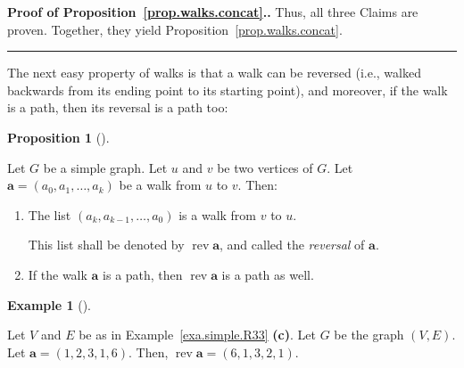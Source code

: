\documentclass[numbers=enddot,12pt,final,onecolumn,notitlepage]{scrartcl}%
\theoremstyle{definition}
\newtheorem{prop}[theo]{Proposition}
\newenvironment{proposition}[1][]
{\begin{prop}[#1]\begin{leftbar}}
{\end{leftbar}\end{prop}}
\newtheorem{exam}[theo]{Example}
\newenvironment{example}[1][]
{\begin{exam}[#1]\begin{leftbar}}
{\end{leftbar}\end{exam}}
\newenvironment{proof}[1][Proof]{\noindent\textbf{#1.} }{\ \rule{0.5em}{0.5em}}
\newcommand{\rev}{\operatorname{rev}}
\newcommand{\tup}[1]{\left( #1 \right)}
\begin{document}
\begin{proof}[Proof of Proposition~\ref{prop.walks.concat}.]
Thus, all three Claims are proven. Together, they yield 
Proposition~\ref{prop.walks.concat}.
\end{proof}

The next easy property of walks is that a walk can be reversed
(i.e., walked backwards from its ending point to its starting
point), and moreover, if the walk is a path, then its reversal
is a path too:

\begin{proposition} \label{prop.walks.rev}
Let $G$ be a simple graph. Let $u$ and $v$ be two vertices of $G$.
Let $\mathbf{a} = \tup{a_0, a_1, \ldots, a_k}$ be a walk from $u$ to
$v$. Then:

\begin{enumerate}

\item[\textbf{(a)}] The list $\tup{a_k, a_{k-1}, \ldots, a_0}$ is
a walk from $v$ to $u$.

This list shall be denoted by $\rev \mathbf{a}$, and called the
\textit{reversal} of $\mathbf{a}$.

\item[\textbf{(b)}] If the walk $\mathbf{a}$ is a path, then
$\rev \mathbf{a}$ is a path as well.

\end{enumerate}
\end{proposition}

\begin{example}
Let $V$ and $E$ be as in Example~\ref{exa.simple.R33} \textbf{(c)}.
Let $G$ be the graph $\tup{V, E}$.
Let $\mathbf{a} = \tup{1, 2, 3, 1, 6}$.
Then, $\rev \mathbf{a} = \tup{6, 1, 3, 2, 1}$.
\end{example}
\end{document}
